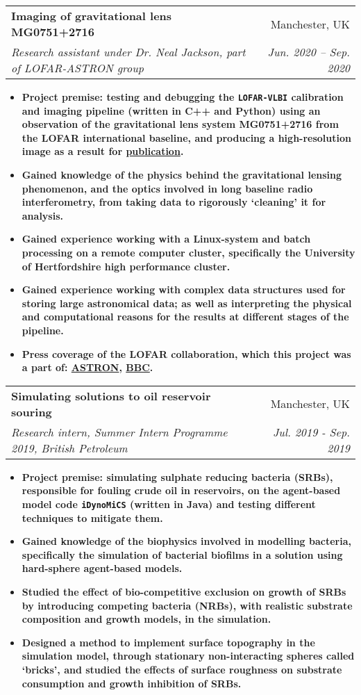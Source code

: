 \documentclass[letterpaper,11pt]{article}
\makeatletter
\newcommand{\resumeItem}[2]{
  \item\small{
    \textbf{#1}{ #2 \vspace{-2pt}}
  }
}
\newcommand{\resumeSubheading}[4]{
  \vspace{-1pt}\item
    \begin{tabular*}{0.97\textwidth}[t]{l@{\extracolsep{\fill}}r}
      \textbf{#1} & #2 \\
      \textit{\small#3} & \textit{\small #4} \\
    \end{tabular*}\vspace{-5pt}
}
\newcommand{\resumeItemListStart}{\begin{itemize}}
\newcommand{\resumeItemListEnd}{\end{itemize}\vspace{-5pt}}
\makeatother
\begin{document}
      \resumeSubheading
      {Imaging of gravitational lens MG0751+2716 }{Manchester, UK}
      {Research assistant under Dr. Neal Jackson, part of LOFAR-ASTRON group}{Jun. 2020 -- Sep. 2020}
      \resumeItemListStart
        \resumeItem
          {\normalfont \textbf{Project premise}: testing and debugging the \texttt{LOFAR-VLBI} calibration and imaging pipeline (written in C++ and Python) using an observation of the gravitational lens system MG0751+2716 from the LOFAR international baseline, and producing a high-resolution image as a result for \href{https://doi.org/10.1051/0004-6361/202141227}{publication}.}{}
        \resumeItem
          {\normalfont Gained knowledge of the physics behind the gravitational lensing phenomenon, and the optics involved in long baseline radio interferometry, from taking data to rigorously `cleaning' it for analysis.}{}
        \resumeItem
          {\normalfont         
          Gained experience working with a Linux-system and batch processing on a remote computer cluster, specifically the University of Hertfordshire high performance cluster.}{}
        \resumeItem
          {\normalfont Gained experience working with complex data structures used for storing large astronomical data; as well as interpreting the physical and computational reasons for the results at different stages of the pipeline.}{}
        \resumeItem
          {\normalfont Press coverage of the LOFAR collaboration, which this project was a part of: \href{https://www.astron.nl/most-detailed-ever-images-of-galaxies-revealed-using-lofar }{ASTRON}, \href{https://www.bbc.co.uk/news/science-environment-57998940}{BBC}.}{}

      \resumeItemListEnd
      
    \resumeSubheading
      {Simulating solutions to oil reservoir souring}{Manchester, UK}
      {Research intern, Summer Intern Programme 2019, British Petroleum}{Jul. 2019 - Sep. 2019}
      \resumeItemListStart
        \resumeItem
          {\normalfont \textbf{Project premise}: simulating sulphate reducing bacteria (SRBs), responsible for fouling crude oil in reservoirs, on the agent-based model code \texttt{iDynoMiCS} (written in Java) and testing different techniques to mitigate them.}{}
        \resumeItem
          {\normalfont Gained knowledge of the biophysics involved in modelling bacteria, specifically the simulation of bacterial biofilms in a solution using hard-sphere agent-based models.}{}
        \resumeItem
          {\normalfont Studied the effect of bio-competitive exclusion on growth of SRBs by introducing competing bacteria (NRBs), with realistic substrate composition and growth models, in the simulation.}{}
        \resumeItem
          {\normalfont Designed a method to implement surface topography in the simulation model, through stationary non-interacting spheres called `bricks', and studied the effects of surface roughness on substrate consumption and growth inhibition of SRBs.}{}
      \resumeItemListEnd
\end{document}
